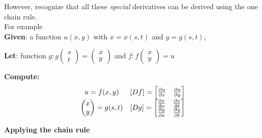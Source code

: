    However, recognize that all these \emph{special} derivatives can be derived using the one chain rule.  \\

   For example\\
   \textbf{Given}: a function $u (x, y)$ with $x = x(s, t)$ and $y = y(s, t)$,

   \textbf{Let}: function  $g: g \begin{pmatrix} s \\ t \end{pmatrix}  = \begin{pmatrix} x \\ y \end{pmatrix} $ and $f: f \begin{pmatrix} x  \\ y\end{pmatrix} = u$

   \textbf{Compute:} \[
      \begin{array}{c c}
         u = f(x, y) &
         \left[ D f \right]_{} = \begin{bmatrix} 
            \frac{\partial u}{\partial x} & \frac{\partial u}{\partial y}
         \end{bmatrix} \\

         \begin{pmatrix} x \\ y \end{pmatrix} = g(s, t) &
         \left[ D g \right]_{}  = \begin{bmatrix} 
            \frac{\partial x}{\partial x} & \frac{\partial x}{\partial t} \\  
            \frac{\partial y}{\partial s} & \frac{\partial y}{\partial t} \\  
         \end{bmatrix}
     \end{array}
   \] 

   \textbf{Applying the chain rule}

